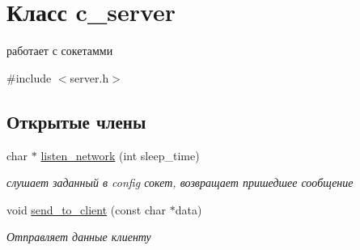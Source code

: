 \hypertarget{classc__server}{}\section{Класс c\+\_\+server}
\label{classc__server}


работает с сокетамми  




{\ttfamily \#include $<$server.\+h$>$}

\subsection*{Открытые члены}
\begin{DoxyCompactItemize}
\item 
char $\ast$ \hyperlink{classc__server_a270ba2fdfc82bc6f21b74c6542b6f358}{listen\+\_\+network} (int sleep\+\_\+time)
\begin{DoxyCompactList}\small\item\em слушает заданный в config сокет, возвращает пришедшее сообщение \end{DoxyCompactList}\item 
void \hyperlink{classc__server_aa7c934f59238687f22365e4c23dddfe4}{send\+\_\+to\+\_\+client} (const char $\ast$data)
\begin{DoxyCompactList}\small\item\em Отправляет данные клиенту \end{DoxyCompactList}\end{DoxyCompactItemize}

